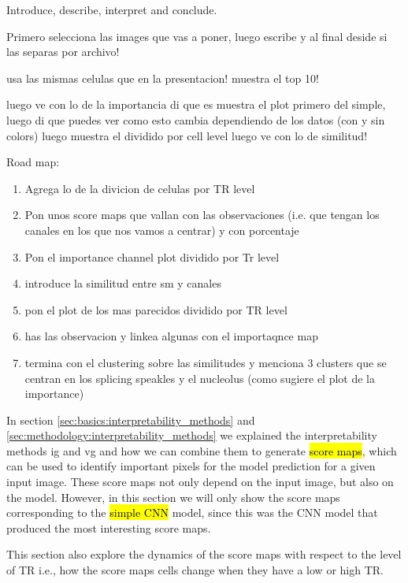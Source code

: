 
\glsresetall
\graphicspath{{./Sections/Results/Resources/}}

Introduce, describe, interpret and conclude.

Primero selecciona las images que vas a poner, luego escribe y al final deside si las separas por archivo!

usa las mismas celulas que en la presentacion! muestra el top 10!

luego ve con lo de la importancia
di que es
muestra el plot primero del simple, luego di que puedes ver como esto cambia dependiendo de los datos (con y sin colors)
luego muestra el dividido por cell level
luego ve con lo de similitud!

Road map:
\begin{enumerate}
  \item Agrega lo de la divicion de celulas por TR level
  \item Pon unos score maps que vallan con las observaciones (i.e. que tengan los canales en los que nos vamos a centrar) y con porcentaje
  \item Pon el importance channel plot dividido por Tr level
  \item introduce la similitud entre sm y canales
  \item pon el plot de los mas parecidos dividido por TR level
  \item has las observacion y linkea algunas con el importaqnce map
  \item termina con el clustering sobre las similitudes y menciona 3 clusters que se centran en los splicing speakles y el nucleolus (como sugiere el plot de la importance)
\end{enumerate}

In section \ref{sec:basics:interpretability_methods} and \ref{sec:methodology:interpretability_methods} we explained the interpretability methods \gls{ig} and \gls{vg} and how we can combine them to generate \hl{score maps}, which can be used to identify important pixels for the model prediction for a given input image. These score maps not only depend on the input image, but also on the model.
However, in this section we will only show the score maps corresponding to the \hl{simple CNN} model, since this was the CNN model that produced the most interesting score maps.

This section also explore the dynamics of the score maps with respect to the level of TR i.e., how the score maps cells change when they have a low or high TR.


